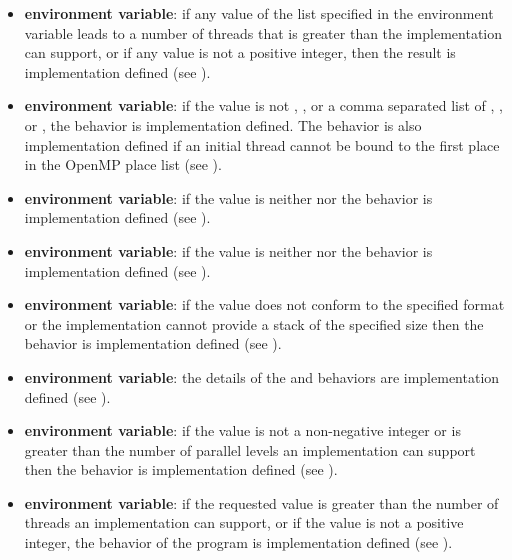 \begin{itemize}
\item {} \textbf{environment variable}: if any value of the list specified in the 
 environment variable leads to a number of threads that is 
greater than the implementation can support, or if any value is not a positive integer, 
then the result is implementation defined (see ).

\item {} \textbf{environment variable}: if the value is not , , or a 
comma separated list of , , or , the behavior is 
implementation defined. The behavior is also implementation defined if an initial 
thread cannot be bound to the first place in the OpenMP place list (see 
).

\item {} \textbf{environment variable}: if the value is neither 
 nor  the behavior is implementation defined (see 
).

\item {} \textbf{environment variable}: if the value is neither 
 nor  the behavior is implementation defined (see 
).

\item {} \textbf{environment variable}: if the value does not conform to the 
specified format or the implementation cannot provide a stack of the specified size 
then the behavior is implementation defined (see ).

\item {} \textbf{environment variable}: the details of the  and 
 behaviors are implementation defined (see ).

\item {} \textbf{environment variable}: if the value is not a 
non-negative integer or is greater than the number of parallel levels an implementation 
can support then the behavior is implementation defined (see ).

\item {} \textbf{environment variable}: if the requested value is greater than 
the number of threads an implementation can support, or if the value is not a positive 
integer, the behavior of the program is implementation defined (see ).


\end{itemize}
